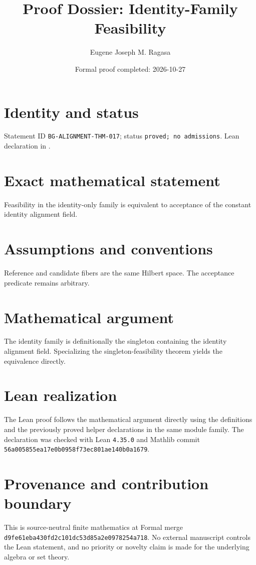 \documentclass[11pt]{article}
\title{Proof Dossier: Identity-Family Feasibility}
\author{Eugene Joseph M. Ragasa}
\date{Formal proof completed: 2026-10-27}
\begin{document}
\raggedright
\maketitle

\section{Identity and status}
Statement ID \texttt{BG-ALIGNMENT-THM-017}; status \texttt{proved; no admissions}.  Lean declaration
 in
.

\section{Exact mathematical statement}
Feasibility in the identity-only family is equivalent to acceptance of the constant identity alignment field.

\section{Assumptions and conventions}
Reference and candidate fibers are the same Hilbert space.  The acceptance predicate remains arbitrary.

\section{Mathematical argument}
The identity family is definitionally the singleton containing the identity alignment field.  Specializing the singleton-feasibility theorem yields the equivalence directly.

\section{Lean realization}
The Lean proof follows the mathematical argument directly using the definitions and the
previously proved helper declarations in the same module family.  The declaration was checked
with Lean \texttt{4.35.0} and Mathlib commit \texttt{56a005855ea17e0b0958f73ec801ae140b0a1679}.

\section{Provenance and contribution boundary}
This is source-neutral finite mathematics at Formal merge
\texttt{d9fe61eba430fd2c101dc53d85a2e0978254a718}.  No external manuscript controls the Lean statement, and no priority or
novelty claim is made for the underlying algebra or set theory.
\end{document}
